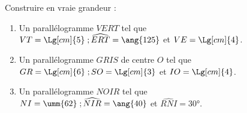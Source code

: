 \begin{exercice*} %
   Construire en vraie grandeur :
   \begin{enumerate}
      \item Un parallélogramme $VERT$ tel que \\
         $VT = \Lg[cm]{5} \; ; \widehat{ERT} =\ang{125}$ et $VE =\Lg[cm]{4}$.
      \item Un parallélogramme $GRIS$ de centre $O$ tel que \\
         $GR =\Lg[cm]{6} \; ; SO =\Lg[cm]{3}$ et $IO =\Lg[cm]{4}$.
      \item Un parallélogramme $NOIR$ tel que \\
         $NI =\umm{62} \; ; \widehat{NIR} =\ang{40}$ et $\widehat{RNI} =\ang{30}$.
   \end{enumerate}
\end{exercice*}
